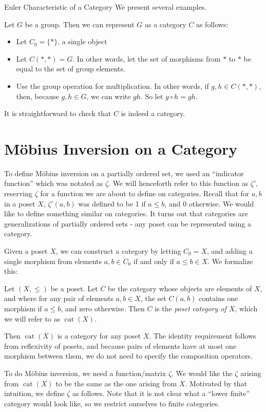 \documentclass[12pt]{pom_thesis}
\DeclareMathOperator{\cat}{cat}
\begin{document}
\begin{chapter}{Euler Characteristic of a Category}
We present several examples.
\begin{examp}
Let $G$ be a group. Then we can represent $G$ as a category $C$ as follows: 
\begin{itemize}
\item Let $C_0 = \{*\}$, a single object
\item Let $C(*, *) = G$. In other words, let the set of morphisms from $*$ to $*$ be equal to the set of group elements. 
\item Use the group operation for multiplication. In other words, if $g,h \in C(*,*)$, then, because $g,h \in G$, we can write $gh$. So let $g \circ h = gh$. 
\end{itemize}
It is straightforward to check that $C$ is indeed a category. 
\end{examp}



\section{M\"obius Inversion on a Category}
To define M\"obius inversion on a partially ordered set, we used an ``indicator function'' which was notated as $\zeta$. We will henceforth refer to this function as $\zeta'$, reserving $\zeta$ for a function we are about to define on categories. Recall that for $a,b$ in a poset $X$, $\zeta'(a,b)$ was defined to be 1 if $a \leq b$, and 0 otherwise. We would like to define something similar on categories. It turns out that categories are generalizations of partially ordered sets - any poset can be represented using a category.

Given a poset $X$, we can construct a category by letting $C_0=X$, and adding a single morphism from elements $a,b \in C_0$ if and only if $a \leq b \in X$. We formalize this:

\begin{defn}\label{cat_poset}
Let $(X, \leq)$ be a poset. Let $C$ be the category whose objects are elements of $X$, and where for any pair of elements $a,b \in X$, the set $C(a,b)$ contains one morphism if $a \leq b$, and zero otherwise. Then $C$ is the \emph{poset category of $X$}, which we will refer to as $\cat(X)$.
\end{defn}
Then $\cat(X)$ is a category for any poset $X$. The identity requirement follows from reflexivity of posets, and because pairs of elements have at most one morphism between them, we do not need to specify the composition operators.

To do M\"obius inversion, we need a function/matrix $\zeta$. We would like the $\zeta$ arising from $\cat(X)$ to be the same as the one arising from $X$. Motivated by that intuition, we define $\zeta$ as follows. Note that it is not clear what a ``lower finite'' category would look like, so we restrict ourselves to finite categories.


\end{chapter}
\end{document}

